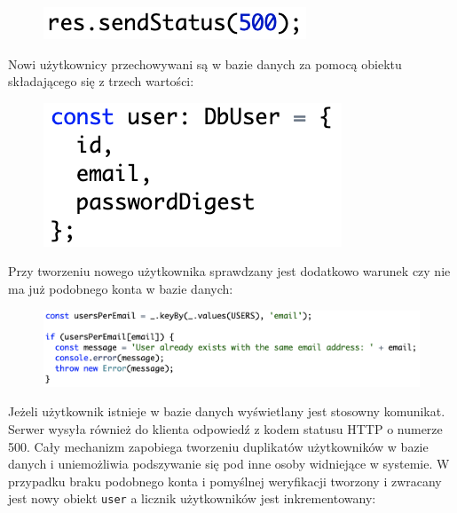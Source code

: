 \begin{figure}[h]
	\includegraphics[scale=0.7]{images/code/res_status_500.png}
\end{figure}

Nowi użytkownicy przechowywani są w bazie danych za pomocą obiektu składającego się z trzech wartości:

\begin{figure}[H]
	\includegraphics[scale=0.7]{images/code/db_content.png}
\end{figure}

Przy tworzeniu nowego użytkownika sprawdzany jest dodatkowo warunek czy nie ma już podobnego konta w bazie danych:

\begin{figure}[H]
	\includegraphics[scale=0.7]{images/code/user_exists.png}
\end{figure}

Jeżeli użytkownik istnieje w bazie danych wyświetlany jest stosowny komunikat. Serwer wysyła również do klienta odpowiedź z kodem statusu HTTP o numerze 500. Cały mechanizm zapobiega tworzeniu duplikatów użytkowników w bazie danych i uniemożliwia podszywanie się pod inne osoby widniejące w systemie. W przypadku braku podobnego konta i pomyślnej weryfikacji tworzony i zwracany jest nowy obiekt \texttt{user} a licznik użytkowników jest inkrementowany:

